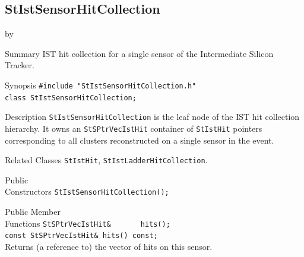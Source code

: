 \documentclass[twoside]{article}
\newcommand{\entrylabel}[1]{\mbox{\textbf{{#1}}}\hfil}%
\newenvironment{entry}
{\begin{list}{}%
    {\renewcommand{\makelabel}{\entrylabel}%
     \setlength{\labelwidth}{90pt}%
     \setlength{\leftmargin}{\labelwidth}
     \advance\leftmargin by \labelsep%
      }%
    }%
  {\end{list}}
\newcommand{\Entrylabel}[1]%
{\raisebox{0pt}[1ex][0pt]{\makebox[\labelwidth][l]%
    {\parbox[t]{\labelwidth}{\hspace{0pt}\textbf{{#1}}}}}}
\newenvironment{Entry}%
{\renewcommand{\entrylabel}{\Entrylabel}\begin{entry}}%
  {\end{entry}}
\begin{document}
\subsection{StIstSensorHitCollection}
\label{sec:StIstSensorHitCollection}
\begin{Entry}
\item[Summary] IST hit collection for a single sensor of the Intermediate
    Silicon Tracker.
\item[Synopsis]
    \verb+#include "StIstSensorHitCollection.h"+\\
    \verb+class StIstSensorHitCollection;+\\
\item[Description]
    \texttt{StIstSensorHitCollection} is the leaf node of the IST hit
    collection hierarchy.  It owns an \texttt{StSPtrVecIstHit} container of
    \texttt{StIstHit} pointers corresponding to all clusters reconstructed on
    a single sensor in the event.
\item[Related Classes]
    \texttt{StIstHit}, \texttt{StIstLadderHitCollection}.
\item[Public\\ Constructors]
    \verb+StIstSensorHitCollection();+\\
\item[Public Member\\ Functions]
    \verb+StSPtrVecIstHit&       hits();+\\
    \verb+const StSPtrVecIstHit& hits() const;+\\
    Returns (a reference to) the vector of hits on this sensor.\\
\end{Entry}
\clearpage

\end{document}
